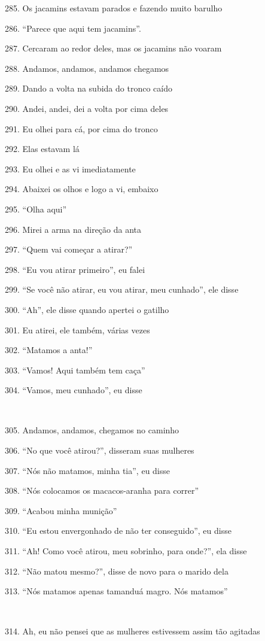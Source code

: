 285. Os jacamins estavam parados e fazendo muito barulho

286. ``Parece que aqui tem jacamins''.

287. Cercaram ao redor deles, mas os jacamins não voaram

288. Andamos, andamos, andamos chegamos

289. Dando a volta na subida do tronco caído

290. Andei, andei, dei a volta por cima deles

291. Eu olhei para cá, por cima do tronco

292. Elas estavam lá

293. Eu olhei e as vi imediatamente

294. Abaixei os olhos e logo a vi, embaixo

295. ``Olha aqui''

296. Mirei a arma na direção da anta

297. ``Quem vai começar a atirar?''

298. ``Eu vou atirar primeiro'', eu falei

299. ``Se você não atirar, eu vou atirar, meu cunhado'', ele disse

300. ``Ah'', ele disse quando apertei o gatilho

301. Eu atirei, ele também, várias vezes

302. ``Matamos a anta!''

303. ``Vamos! Aqui também tem caça''

304. ``Vamos, meu cunhado'', eu disse

~

305. Andamos, andamos, chegamos no caminho

306. ``No que você atirou?'', disseram suas mulheres

307. ``Nós não matamos, minha tia'', eu disse

308. ``Nós colocamos os macacos-aranha para correr''

309. ``Acabou minha munição''

310. ``Eu estou envergonhado de não ter conseguido'', eu disse

311. ``Ah! Como você atirou, meu sobrinho, para onde?'', ela disse

312. ``Não matou mesmo?'', disse de novo para o marido dela

313. ``Nós matamos apenas tamanduá magro. Nós matamos''

~

314. Ah, eu não pensei que as mulheres estivessem assim tão agitadas

